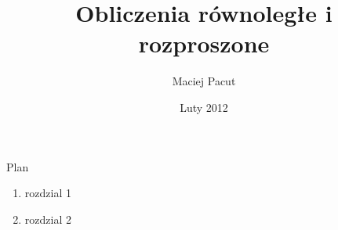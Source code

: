 \documentclass{beamer}
\title{Obliczenia równoległe i rozproszone}
\author{Maciej Pacut}
\date{Luty 2012}
\begin{document}
\maketitle

\begin{frame}{Plan}
  \begin{enumerate}
    \item rozdzial 1
    \item rozdzial 2
  \end{enumerate}
\end{frame}
\end{document}

